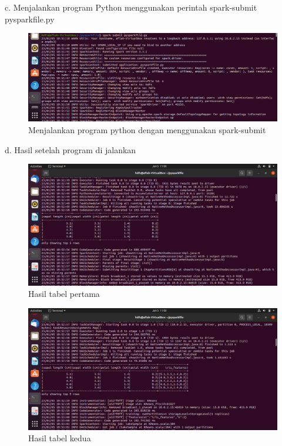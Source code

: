 \begin{enumerate}
c. Menjalankan program Python menggunakan perintah spark-submit pysparkfile.py
\newpage
\begin{figure} [!ht]
\includegraphics[width=\textwidth] {TugasKelompok/Kelompok3/sparksubmit}
\caption{Menjalankan program python dengan menggunakan spark-submit}
\label{gam:hasil tugas kelompok}
\end{figure}

d. Hasil setelah program di jalankan

\begin{figure} [!ht]
\includegraphics[width=\textwidth] {TugasKelompok/Kelompok3/tabel1}
\caption{Hasil tabel pertama}
\label{gam:hasil tugas kelompok}
\end{figure}

\begin{figure} [!ht]
\includegraphics[width=\textwidth] {TugasKelompok/Kelompok3/tabel2}
\caption{Hasil tabel kedua}
\label{gam:hasil tugas kelompok}
\end{figure}


\end{enumerate}
